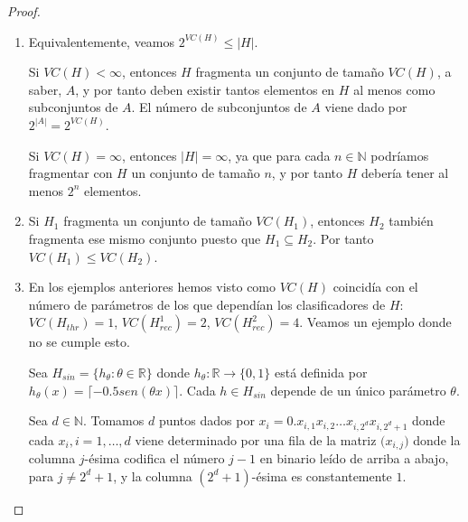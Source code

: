 \begin{proof}~
 \begin{enumerate}[i]
  \item Equivalentemente, veamos $2^{VC(H)} \le |H|$. 
  
  Si $VC(H) < \infty$, entonces $H$ fragmenta un conjunto de tamaño
  $VC(H)$, a saber, $A$, y por tanto deben existir tantos elementos en $H$ al menos como subconjuntos de $A$. El número de
  subconjuntos de $A$ viene dado por $2^{|A|} = 2^{VC(H)}$. 
  
  Si $VC(H) = \infty$, entonces $|H| = \infty$, ya que para cada 
  $n\in \mathbb{N}$ podríamos fragmentar con $H$ un conjunto de tamaño $n$, y por tanto $H$ debería tener al menos $2^n$ 
  elementos.
  
  \item Si $H_1$ fragmenta un conjunto de tamaño $VC(H_1)$, entonces $H_2$ también fragmenta ese mismo conjunto puesto que
  $H_1 \subseteq H_2$. Por tanto $VC(H_1) \le VC(H_2)$.
 
  \item En los ejemplos anteriores hemos visto como $VC(H)$ coincidía con el número de parámetros de los que dependían los
  clasificadores de $H$: $VC(H_{thr}) = 1$, $VC(H^1_{rec}) = 2$, $VC(H^2_{rec}) = 4$. Veamos un ejemplo donde no se cumple
  esto.
  
  Sea $H_{sin} = \{h_{\theta}: \theta \in \mathbb{R}\}$ donde $h_{\theta}: \mathbb{R} \rightarrow \{0,1\}$ está definida por 
  $h_\theta (x) = \lceil -0.5sen(\theta x) \rceil$. Cada $h \in H_{sin}$ depende de un único parámetro $\theta$.
  
  Sea $d\in \mathbb{N}$. Tomamos $d$ puntos dados por $x_i = 0.x_{i,1} x_{i,2} \ldots x_{i, 2^d} x_{i, 2^d+1}$ 
  donde cada $x_{i}, i=1, \ldots, d$ viene determinado por una fila de la matriz $\bigg(x_{i,j}\bigg)$
  donde la columna $j$-ésima codifica el número $j-1$ en binario leído de arriba a abajo, para $j\neq 2^d+1$, y la columna 
  $(2^d+1)$-ésima es constantemente $1$.
  

\end{enumerate}
\end{proof}
